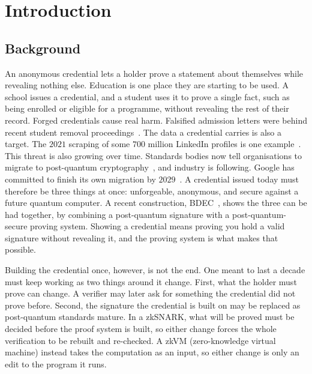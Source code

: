 \section{Introduction}\label{sec:intro}
\subsection{Background}
An anonymous credential lets a holder prove a statement about themselves while revealing nothing else. Education is one place they are starting to be used. A school issues a credential, and a student uses it to prove a single fact, such as being enrolled or eligible for a programme, without revealing the rest of their record. Forged credentials cause real harm. Falsified admission letters were behind recent student removal proceedings~\cite{bbc2023canada}. The data a credential carries is also a target. The $2021$ scraping of some $700$ million LinkedIn profiles is one example~\cite{nixon2021linkedin}. This threat is also growing over time. Standards bodies now tell organisations to migrate to post-quantum cryptography~\cite{nistir8547}, and industry is following. Google has committed to finish its own migration by $2029$~\cite{adkins2026google}. A credential issued today must therefore be three things at once: unforgeable, anonymous, and secure against a future quantum computer. A recent construction, BDEC~\cite{10.1007/978-981-96-0957-4_3}, shows the three can be had together, by combining a post-quantum signature with a post-quantum-secure proving system. Showing a credential means proving you hold a valid signature without revealing it, and the proving system is what makes that possible.

Building the credential once, however, is not the end. One meant to last a decade must keep working as two things around it change. First, what the holder must prove can change. A verifier may later ask for something the credential did not prove before. Second, the signature the credential is built on may be replaced as post-quantum standards mature. In a zkSNARK, what will be proved must be decided before the proof system is built, so either change forces the whole verification to be rebuilt and re-checked. A zkVM (zero-knowledge virtual machine) instead takes the computation as an input, so either change is only an edit to the program it runs.

